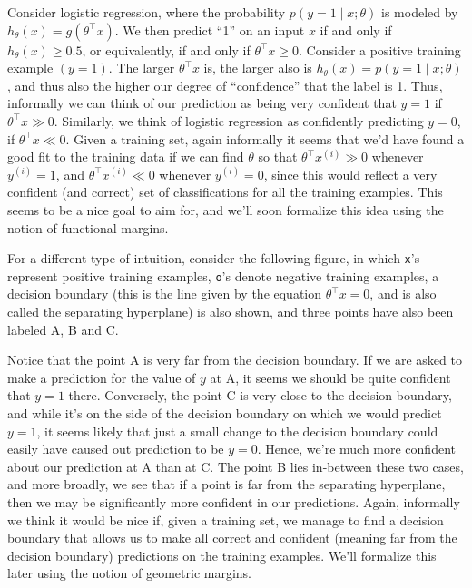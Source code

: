 Consider logistic regression, where the probability $p(y = 1 \mid x;\theta)$ is modeled
by $h_\theta (x) = g(\theta^\top x)$. We then predict ``1'' on an input $x$ if and only if
$h_\theta (x) \ge 0.5$, or equivalently, if and only if $\theta^\top x \ge 0$. Consider a positive
training example $(y = 1)$. The larger $\theta^\top x$ is, the larger also is $h_\theta (x) = p(y = 1 \mid x;\theta)$,
and thus also the higher our degree of ``confidence'' that the label is 1.
Thus, informally we can think of our prediction as being very confident that
$y = 1$ if $\theta^\top x \gg 0$. Similarly, we think of logistic regression as confidently
predicting $y = 0$, if $\theta^\top x \ll 0$. Given a training set, again informally it seems
that we'd have found a good fit to the training data if we can find $\theta$ so that
$\theta^\top x^{(i)} \gg 0$ whenever $y^{(i)} = 1$, and $\theta^\top x^{(i)} \ll 0$ whenever $y^{(i)} = 0$, since this
would reflect a very confident (and correct) set of classifications for all the
training examples. This seems to be a nice goal to aim for, and we'll soon
formalize this idea using the notion of functional margins.

For a different type of intuition, consider the following figure, in which \texttt{x}'s
represent positive training examples, \texttt{o}'s denote negative training examples,
a decision boundary (this is the line given by the equation $\theta^\top x = 0$, and
is also called the separating hyperplane) is also shown, and three points
have also been labeled A, B and C.

Notice that the point A is very far from the decision boundary. If we are
asked to make a prediction for the value of $y$ at A, it seems we should be
quite confident that $y = 1$ there. Conversely, the point C is very close to
the decision boundary, and while it's on the side of the decision boundary
on which we would predict $y = 1$, it seems likely that just a small change to
the decision boundary could easily have caused out prediction to be $y = 0$.
Hence, we're much more confident about our prediction at A than at C. The
point B lies in-between these two cases, and more broadly, we see that if
a point is far from the separating hyperplane, then we may be significantly
more confident in our predictions. Again, informally we think it would be
nice if, given a training set, we manage to find a decision boundary that
allows us to make all correct and confident (meaning far from the decision
boundary) predictions on the training examples. We'll formalize this later
using the notion of geometric margins.

